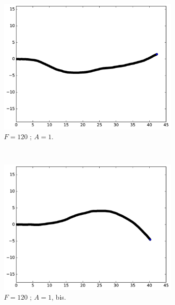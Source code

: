 	\begin{figure}[!htb]
		\begin{subfigure}[t]{0.23\textwidth}
			\centering
			\includegraphics[width=\textwidth]{figures/ch3/ac_2_19_1_120a}
			\caption{$F=120$ ; $A=1$.}
			\label{fig:ac1_120A}
		\end{subfigure}
		~
		\begin{subfigure}[t]{0.23\textwidth}
			\centering
			\includegraphics[width=\textwidth]{figures/ch3/ac_2_19_1_120b}
			\caption{$F=120$ ; $A=1$, bis.}
			\label{fig:ac_1_120B}
		\end{subfigure}
		~
		\begin{subfigure}[t]{0.23\textwidth}
			\centering

\end{subfigure}
\end{figure}
